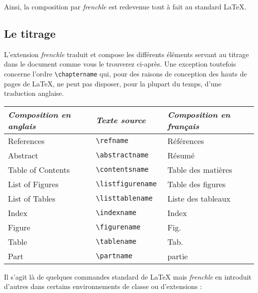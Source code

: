 \documentclass[a4paper,12pt,openright]{article}
\begin{document}
Ainsi, la composition par \textit{frenchle} est redevenue tout à fait au standard
\LaTeX.
\pagebreak
\subsection{ Le titrage}
L’extension \textit{frenchle} traduit et compose les différents éléments servant au
titrage dans le document comme vous le trouverez ci-après. Une exception
toutefois concerne l’ordre \verb|\chaptername| qui, pour des raisons de conception
des hauts de pages de \LaTeX, ne peut pas disposer, pour la plupart du temps,
d’une traduction anglaise.\\[1em]

\begin{tabular}{|l|l|l|}\hline
\rule{0pt}{1.1em}\textit{Composition en anglais}&\textit{Texte source}&\textit{Composition en français}\\\hline
\rule{0pt}{1em}References         &\tt{\backslash}refname        &Références \index{refname@\verb'\refname '}         \\
Abstract           &\tt{\backslash}abstractname   &Résumé    \index{abstractname@\verb'\abstractname '}         \\
Table of Contents  &\tt{\backslash}contentsname   &Table des matières \index{contentsname@\verb'\contentsname'}\\
List of Figures    &\tt{\backslash}listfigurename &Table des figures  \index{listfigurename@\verb'\listfigurename'}\\
List of Tables     &\tt{\backslash}listtablename  &Liste des tableaux\index{listtablename@\verb'\listtablename'} \\
Index              &\tt{\backslash}indexname      &Index            \index{indexname@\verb'\indexname'}  \\
Figure             &\tt{\backslash}figurename     &Fig.            \index{figurename@\verb'\figurename'}   \\
Table              &\tt{\backslash}tablename      &Tab.          \index{tablename@\verb'\tablename'}     \\
Part               &\tt{\backslash}partname       &partie        \index{partname@\verb'\partname'}     \\
\hline
\end{tabular}

\bigskip
\pagebreak
Il s’agit là de quelques commandes standard de \LaTeX{} mais \textit{frenchle} en
introduit d’autres dans certains environnements de classe ou d’extensions :
\end{document}

